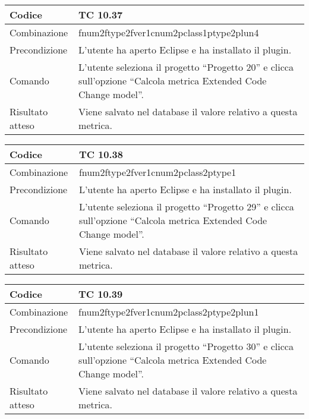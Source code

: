 \begin{table}[ht]
\begin{tabular}{|p{3cm}|p{9cm}|}
\hline
\cellcolor{lightgray}Codice				& TC 10.37								\\
\hline
\cellcolor{lightgray}Combinazione		& fnum2ftype2fver1cnum2pclass1ptype2plun4									\\
\hline
\cellcolor{lightgray}Precondizione		& L'utente ha aperto Eclipse e ha installato il plugin.		\\
\hline
\cellcolor{lightgray}Comando			& L'utente seleziona il progetto ``Progetto 20''  e clicca sull'opzione ``Calcola metrica Extended Code Change model''.	\\
\hline
\cellcolor{lightgray}Risultato atteso	& Viene salvato nel database il valore relativo a questa metrica.\\
\hline
\end{tabular}
\end{table}

\begin{table}[ht]
\begin{tabular}{|p{3cm}|p{9cm}|}
\hline
\cellcolor{lightgray}Codice				& TC 10.38								\\
\hline
\cellcolor{lightgray}Combinazione		& fnum2ftype2fver1cnum2pclass2ptype1									\\
\hline
\cellcolor{lightgray}Precondizione		& L'utente ha aperto Eclipse e ha installato il plugin.		\\
\hline
\cellcolor{lightgray}Comando			& L'utente seleziona il progetto ``Progetto 29''  e clicca sull'opzione ``Calcola metrica Extended Code Change model''.	\\
\hline
\cellcolor{lightgray}Risultato atteso	& Viene salvato nel database il valore relativo a questa metrica.\\
\hline
\end{tabular}
\end{table}

\begin{table}[ht]
\begin{tabular}{|p{3cm}|p{9cm}|}
\hline
\cellcolor{lightgray}Codice				& TC 10.39								\\
\hline
\cellcolor{lightgray}Combinazione		& fnum2ftype2fver1cnum2pclass2ptype2plun1									\\
\hline
\cellcolor{lightgray}Precondizione		& L'utente ha aperto Eclipse e ha installato il plugin.		\\
\hline
\cellcolor{lightgray}Comando			& L'utente seleziona il progetto ``Progetto 30''  e clicca sull'opzione ``Calcola metrica Extended Code Change model''.	\\
\hline
\cellcolor{lightgray}Risultato atteso	& Viene salvato nel database il valore relativo a questa metrica.\\
\hline
\end{tabular}
\end{table}

